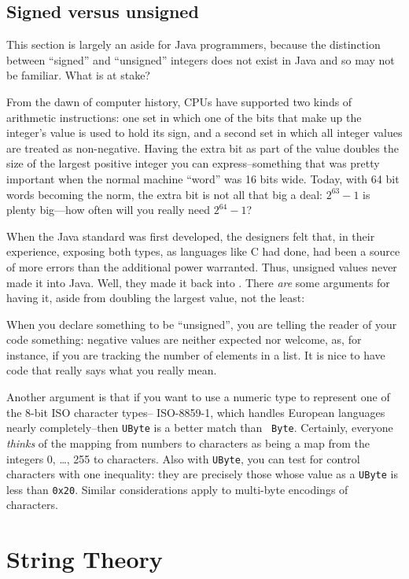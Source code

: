 \subsection{Signed versus unsigned}
This section is largely an aside for Java programmers, because the distinction
between ``signed''  and ``unsigned'' integers does not exist in Java and so may
not be familiar. What is at stake?

From the dawn of computer history, CPUs have supported two kinds of arithmetic
instructions: one set in which one of the bits that make up the integer's value
is used to hold its sign, and a second set in which all integer values are
treated as non-negative.  Having the extra bit as part of the value doubles the
size of the largest positive integer you can express--something that was pretty
important when the normal machine ``word'' was 16 bits wide.  Today, with 64
bit words becoming the norm, the extra bit is not all that big a deal:
$2^{63}-1$ is plenty big---how often will you really need $2^{64}-1$?

When the Java standard was first developed, the designers
felt that, in their experience, exposing both types, as languages like C had done,
had been a source of more errors than the additional
power warranted.  Thus, unsigned values never made it into Java.  Well, they
made it back into \Xten{}. There {\em are} some arguments for having it, aside
from doubling the largest value, not the least:

When you declare something to be ``unsigned'', you are telling the reader of
your code something:  negative values are neither expected nor welcome,
as, for instance, if you are tracking the number of elements in a list.
It is nice to have code that really says what you really mean.

Another argument is that if you want to use a numeric type to represent one of
the 8-bit ISO character types--\eg{} ISO-8859-1, which handles European
languages nearly completely--then {\tt UByte} is a better match than {\tt
Byte}.  Certainly, everyone {\em thinks} of the mapping from numbers to
characters as being a map from the integers 0, \ldots, 255 to characters. Also
with {\tt UByte}, you can test for control characters with one inequality: they
are precisely those whose value as a {\tt UByte} is less than {\tt 0x20}.
Similar considerations apply to multi-byte encodings of characters.

\section{String Theory}

